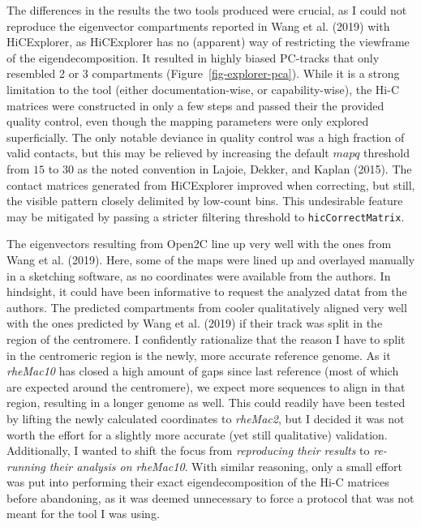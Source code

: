 \documentclass[
  11pt,
  a4paper,
]{scrbook}
\begin{document}
The differences in the results the two tools produced were crucial, as I
could not reproduce the eigenvector compartments reported in Wang et al.
(2019) with HiCExplorer, as HiCExplorer has no (apparent) way of
restricting the viewframe of the eigendecomposition. It resulted in
highly biased PC-tracks that only resembled 2 or 3 compartments
(Figure~\ref{fig-explorer-pca}). While it is a strong limitation to the
tool (either documentation-wise, or capability-wise), the Hi-C matrices
were constructed in only a few steps and passed their the provided
quality control, even though the mapping parameters were only explored
superficially. The only notable deviance in quality control was a high
fraction of valid contacts, but this may be relieved by increasing the
default \(mapq\) threshold from \(15\) to \(30\) as the noted convention
in Lajoie, Dekker, and Kaplan (2015). The contact matrices generated
from HiCExplorer improved when correcting, but still, the visible
pattern closely delimited by low-count bins. This undesirable feature
may be mitigated by passing a stricter filtering threshold to
\texttt{hicCorrectMatrix}.

The eigenvectors resulting from Open2C line up very well with the ones
from Wang et al. (2019). Here, some of the maps were lined up and
overlayed manually in a sketching software, as no coordinates were
available from the authors. In hindsight, it could have been informative
to request the analyzed datat from the authors. The predicted
compartments from cooler qualitatively aligned very well with the ones
predicted by Wang et al. (2019) if their track was split in the region
of the centromere. I confidently rationalize that the reason I have to
split in the centromeric region is the newly, more accurate reference
genome. As it \emph{rheMac10} has closed a high amount of gaps since
last reference (most of which are expected around the centromere), we
expect more sequences to align in that region, resulting in a longer
genome as well. This could readily have been tested by lifting the newly
calculated coordinates to \emph{rheMac2}, but I decided it was not worth
the effort for a slightly more accurate (yet still qualitative)
validation. Additionally, I wanted to shift the focus from
\emph{reproducing their results} to \emph{re-running their analysis on
rheMac10}. With similar reasoning, only a small effort was put into
performing their exact eigendecomposition of the Hi-C matrices before
abandoning, as it was deemed unnecessary to force a protocol that was
not meant for the tool I was using.
\end{document}

